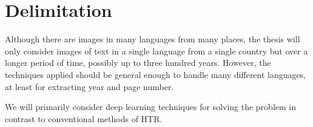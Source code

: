 \section{Delimitation}

Although there are images in many languages from many places, the thesis will only consider images of text in a single language from a single country but over a longer period of time, possibly up to three hundred years.
However, the techniques applied should be general enough to handle many different languages, at least for extracting year and page number.

We will primarily consider deep learning techniques for solving the problem in contrast to conventional methods of HTR.
